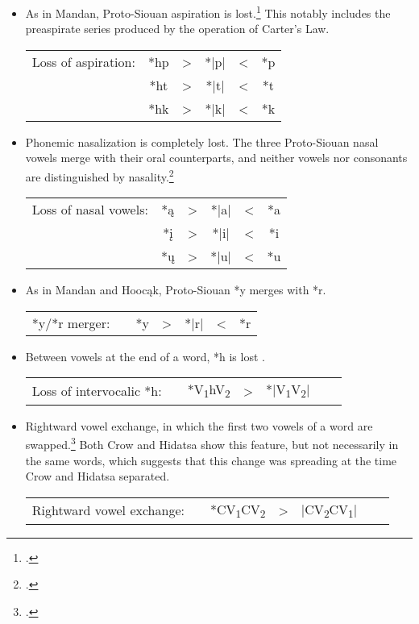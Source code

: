 \documentclass[output=paper]{LSP/langsci}
\begin{document}
\begin{itemize}
\item As in Mandan, Proto-Siouan aspiration is lost.\footnote{\citealt[50, 85]{CSD2006}.} This notably includes the preaspirate series produced by the operation of Carter's Law.

				
\begin{tabular}[t]{c c c c c c }
Loss of aspiration: & *hp & > & *|p|	& < & 	*p \\
& *ht	 & > & *|t|	& <	 & *t \\
& *hk & > & *|k|	 & < & *k \\
\end{tabular}

\item Phonemic nasalization is completely lost.  The three Proto-Siouan nasal vowels merge with their oral counterparts, and neither vowels nor consonants are distinguished by nasality.\footnote{\citealt[109]{CSD2006}.}


\begin{tabular}[t]{c c c c c c }
Loss of nasal vowels: &	*\k{a} & >	& *|a| & < & *a \\
& *\k{i} & > & *|i| & < & *i \\
& *\k{u} & > & *|u| & < & *u \\
\end{tabular}

\item As in Mandan and Hooc\k{a}k, Proto-Siouan *y merges with *r.



\begin{tabular}[t]{c c c c c c c}
*y/*r merger: & & *y	 & >  & *|r| &  <	 & *r 
\end{tabular}

\item Between vowels at the end of a word, *h is lost .



\begin{tabular}[t]{c c c c c c c}
Loss of intervocalic *h: & & *V\textsubscript{1}hV\textsubscript{2} & > & *|V\textsubscript{1}V\textsubscript{2}|	
\end{tabular}

\item Rightward vowel exchange, in which the first two vowels of a word are swapped.\footnote{\citealt[193, 788]{CSD2006}.}  Both Crow and Hidatsa show this feature, but not necessarily in the same words, which suggests that this change was spreading at the time Crow and Hidatsa separated.



\begin{tabular}[t]{c c c c c c c}
Rightward vowel exchange:	 & & *CV\textsubscript{1}CV\textsubscript{2} & > & |CV\textsubscript{2}CV\textsubscript{1}|	
\end{tabular}
\end{itemize}
\end{document}
